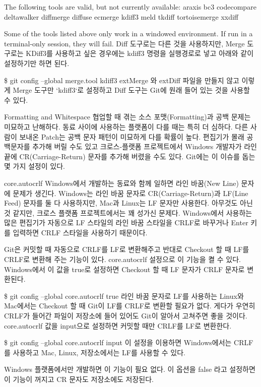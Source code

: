 \documentclass[12pt, a4paper, oneside]{book}
\begin{document}
The following tools are valid, but not currently available:
        araxis
        bc3
        codecompare
        deltawalker
        diffmerge
        diffuse
        ecmerge
        kdiff3
        meld
        tkdiff
        tortoisemerge
        xxdiff

Some of the tools listed above only work in a windowed
environment. If run in a terminal-only session, they will fail.
Diff 도구로는 다른 것을 사용하지만, Merge 도구로는 KDiff3를 사용하고 싶은 경우에는 kdiff3 명령을 실행경로로 넣고 아래와 같이 설정하기만 하면 된다.

\$ git config --global merge.tool kdiff3
extMerge 와 extDiff 파일을 만들지 않고 이렇게 Merge 도구만 `kdiff3`로 설정하고 Diff 도구는 Git에 원래 들어 있는 것을 사용할 수 있다.

Formatting and Whitespace
협업할 때 겪는 소스 포맷(Formatting)과 공백 문제는 미묘하고 난해하다. 동료 사이에 사용하는 플랫폼이 다를 때는 특히 더 심하다. 다른 사람이 보내온 Patch는 공백 문자 패턴이 미묘하게 다를 확률이 높다. 편집기가 몰래 공백문자를 추가해 버릴 수도 있고 크로스-플랫폼 프로젝트에서 Windows 개발자가 라인 끝에 CR(Carriage-Return) 문자를 추가해 버렸을 수도 있다. Git에는 이 이슈를 돕는 몇 가지 설정이 있다.

core.autocrlf
Windows에서 개발하는 동료와 함께 일하면 라인 바꿈(New Line) 문자에 문제가 생긴다. Windows는 라인 바꿈 문자로 CR(Carriage-Return)과 LF(Line Feed) 문자를 둘 다 사용하지만, Mac과 Linux는 LF 문자만 사용한다. 아무것도 아닌 것 같지만, 크로스 플랫폼 프로젝트에서는 꽤 성가신 문제다. Windows에서 사용하는 많은 편집기가 자동으로 LF 스타일의 라인 바꿈 스타일을 CRLF로 바꾸거나 Enter 키를 입력하면 CRLF 스타일을 사용하기 때문이다.

Git은 커밋할 때 자동으로 CRLF를 LF로 변환해주고 반대로 Checkout 할 때 LF를 CRLF로 변환해 주는 기능이 있다. core.autocrlf 설정으로 이 기능을 켤 수 있다. Windows에서 이 값을 true로 설정하면 Checkout 할 때 LF 문자가 CRLF 문자로 변환된다.

\$ git config --global core.autocrlf true
라인 바꿈 문자로 LF를 사용하는 Linux와 Mac에서는 Checkout 할 때 Git이 LF를 CRLF로 변환할 필요가 없다. 게다가 우연히 CRLF가 들어간 파일이 저장소에 들어 있어도 Git이 알아서 고쳐주면 좋을 것이다. core.autocrlf 값을 input으로 설정하면 커밋할 때만 CRLF를 LF로 변환한다.

\$ git config --global core.autocrlf input
이 설정을 이용하면 Windows에서는 CRLF를 사용하고 Mac, Linux, 저장소에서는 LF를 사용할 수 있다.

Windows 플랫폼에서만 개발하면 이 기능이 필요 없다. 이 옵션을 false 라고 설정하면 이 기능이 꺼지고 CR 문자도 저장소에도 저장된다.
\end{document}
